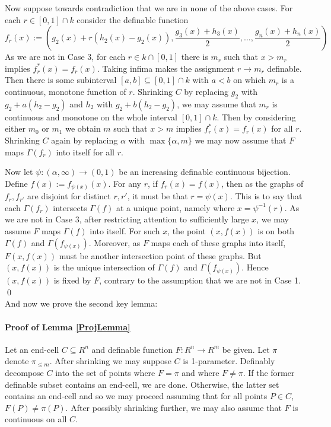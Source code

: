 \documentclass{article}
\theoremstyle{remark}
\theoremstyle{definition}
\theoremstyle{definition}
\theoremstyle{definition}
\theoremstyle{definition}
\begin{document}
    Now suppose towards contradiction that we are in none of the above cases. For each $r\in[0,1]\cap k$ consider the definable function
    \[f_r(x):= (g_2(x)+r(h_2(x)-g_2(x)),\frac{g_3(x)+h_3(x)}{2},\dots,\frac{g_n(x)+h_n(x)}{2})\]
    As we are not in Case 3, for each $r\in k\cap[0,1]$ there is $m_r$ such that $x>m_r$ implies $f_r^*(x)=f_r(x)$. Taking infima makes the assignment $r\to m_r$ definable. Then there is some subinterval $[a,b]\subseteq [0,1]\cap k$ with $a<b$ on which $m_r$ is a continuous, monotone function of $r$. Shrinking $C$ by replacing $g_2$ with $g_2+a(h_2-g_2)$ and $h_2$ with $g_2+b(h_2-g_2)$, we may assume that $m_r$ is continuous and monotone on the whole interval $[0,1]\cap k$. Then by considering either $m_0$ or $m_1$ we obtain $m$ such that $x>m$ implies $f^*_r(x)=f_r(x)$ for all $r$. Shrinking $C$ again by replacing $\alpha$ with $\max\{\alpha,m\}$ we may now assume that $F$ maps $\Gamma(f_r)$ into itself for all $r$.

    Now let $\psi:(\alpha,\infty)\to(0,1)$ be an increasing definable continuous bijection. Define $f(x):=f_{\psi(x)}(x)$. For any $r$, if $f_r(x)=f(x)$, then as the graphs of $f_r,f_{r'}$ are disjoint for distinct $r,r'$, it must be that $r=\psi(x)$. This is to say that each $\Gamma(f_r)$ intersects $\Gamma(f)$ at a unique point, namely where $x=\psi^{-1}(r)$. As we are not in Case 3, after restricting attention to sufficiently large $x$, we may assume $F$ maps $\Gamma(f)$ into itself. For such $x$, the point $(x,f(x))$ is on both $\Gamma(f)$ and $\Gamma(f_{\psi(x)})$. Moreover, as $F$ maps each of these graphs into itself, $F(x,f(x))$ must be another intersection point of these graphs. But $(x,f(x))$ is the unique intersection of $\Gamma(f)$ and $\Gamma(f_{\psi(x)})$. Hence $(x,f(x))$ is fixed by $F$, contrary to the assumption that we are not in Case 1. \qed
    \\

And now we prove the second key lemma:
\paragraph{Proof of Lemma \ref{ProjLemma}}
    Let an end-cell $C\subseteq R^n$ and definable function $F:R^n\to R^m$ be given. Let $\pi$ denote $\pi_{\leq m}$. After shrinking we may suppose $C$ is 1-parameter. Definably decompose $C$ into the set of points where $F=\pi$ and where $F\neq \pi$. If the former definable subset contains an end-cell, we are done. Otherwise, the latter set contains an end-cell and so we may proceed assuming that for all points $P\in C$, $F(P)\neq \pi(P)$. After possibly shrinking further, we may also assume that $F$ is continuous on all $C$.
\end{document}
